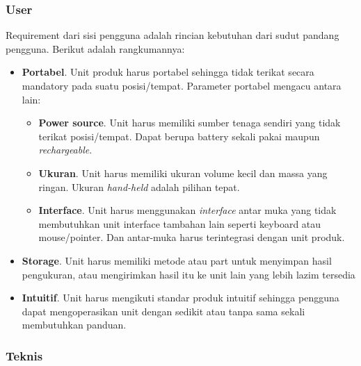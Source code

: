 \documentclass[12pt,]{article}
\begin{document}
	\subsubsection{User}
	Requirement dari sisi pengguna adalah rincian kebutuhan dari sudut pandang pengguna.
	Berikut adalah rangkumannya:
	\begin{itemize}
		\item \textbf{Portabel}. Unit produk harus portabel sehingga tidak terikat secara mandatory
		pada suatu posisi/tempat.
		Parameter portabel mengacu antara lain:
		\begin{itemize}
			\item \textbf{Power source}. Unit harus memiliki sumber tenaga sendiri yang tidak terikat posisi/tempat.
			Dapat berupa battery sekali pakai maupun \textit{rechargeable}.
			
			\item \textbf{Ukuran}. Unit harus memiliki ukuran volume kecil dan massa yang ringan.
			Ukuran \textit{hand-held} adalah pilihan tepat.
			
			\item \textbf{Interface}. Unit harus menggunakan \textit{interface} antar muka yang tidak membutuhkan unit
			interface tambahan lain seperti keyboard atau mouse/pointer.
			Dan antar-muka harus terintegrasi dengan unit produk.
			
		\end{itemize}
	
		\item \textbf{Storage}. Unit harus memiliki metode atau part untuk menyimpan hasil pengukuran,
		atau mengirimkan hasil itu ke unit lain yang lebih lazim tersedia
		
		\item \textbf{Intuitif}. Unit harus mengikuti standar produk intuitif sehingga pengguna 
		dapat mengoperasikan unit dengan sedikit atau tanpa sama sekali membutuhkan panduan.
	\end{itemize}
	
	\subsubsection{Teknis}
	
\end{document}
